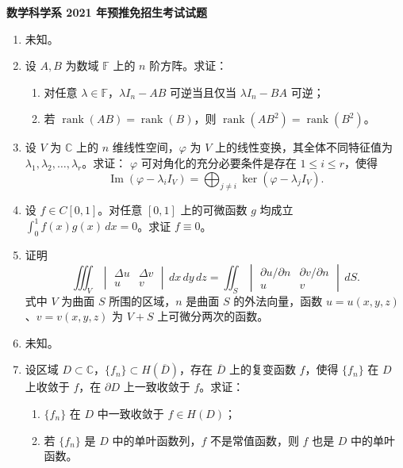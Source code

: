 \documentclass[UTF8,11pt,fontset=none]{ctexart}
\newcommand{\paperheading}[1]{\begin{center}\Large\bfseries #1\end{center}\vspace{.45em}}
\newcommand{\newpaper}[1]{\clearpage\paperheading{#1}}
\begin{document}
\newpaper{数学科学系 2021 年预推免招生考试试题}
\begin{enumerate}
\item 未知。
\item 设 $A,B$ 为数域 $\mathbb F$ 上的 $n$ 阶方阵。求证：
\begin{enumerate}
\item 对任意 $\lambda\in\mathbb F$，$\lambda I_n-AB$ 可逆当且仅当 $\lambda I_n-BA$ 可逆；
\item 若 $\operatorname{rank}(AB)=\operatorname{rank}(B)$，则 $\operatorname{rank}(AB^2)=\operatorname{rank}(B^2)$。
\end{enumerate}
\item 设 $V$ 为 $\mathbb C$ 上的 $n$ 维线性空间，$\varphi$ 为 $V$ 上的线性变换，其全体不同特征值为 $\lambda_1,\lambda_2,\ldots,\lambda_r$。求证：
$\varphi$ 可对角化的充分必要条件是存在 $1\le i\le r$，使得
\[
\operatorname{Im}(\varphi-\lambda_i I_V)
=\bigoplus_{j\ne i}\ker(\varphi-\lambda_jI_V).
\]
\item 设 $f\in C[0,1]$。对任意 $[0,1]$ 上的可微函数 $g$ 均成立
$\displaystyle\int_0^1 f(x)g(x)\,dx=0$。求证 $f\equiv0$。
\item 证明
\[
\iiint_V\begin{vmatrix}\Delta u&\Delta v\\u&v\end{vmatrix}\,dx\,dy\,dz
=\iint_S\begin{vmatrix}\partial u/\partial n&\partial v/\partial n\\u&v\end{vmatrix}\,dS.
\]
式中 $V$ 为曲面 $S$ 所围的区域，$n$ 是曲面 $S$ 的外法向量，函数 $u=u(x,y,z)$、$v=v(x,y,z)$ 为 $V+S$ 上可微分两次的函数。
\item 未知。
\item 设区域 $D\subset\mathbb C$，$\{f_n\}\subset H(\overline D)$，存在 $\overline D$ 上的复变函数 $f$，使得 $\{f_n\}$ 在 $D$ 上收敛于 $f$，在 $\partial D$ 上一致收敛于 $f$。求证：
\begin{enumerate}
\item $\{f_n\}$ 在 $D$ 中一致收敛于 $f\in H(D)$；
\item 若 $\{f_n\}$ 是 $D$ 中的单叶函数列，$f$ 不是常值函数，则 $f$ 也是 $D$ 中的单叶函数。
\end{enumerate}
\end{enumerate}
\end{document}
